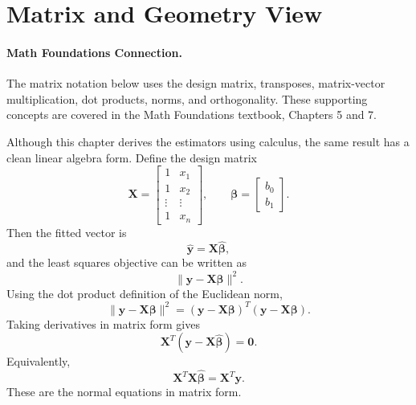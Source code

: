 \section{Matrix and Geometry View}

\paragraph{Math Foundations Connection.}
The matrix notation below uses the design matrix, transposes, matrix-vector multiplication, dot products, norms, and orthogonality.  These supporting concepts are covered in the Math Foundations textbook, Chapters 5 and 7.

Although this chapter derives the estimators using calculus, the same result has a clean linear algebra form.  Define the design matrix
\begin{equation}
  \mathbf{X}=\begin{bmatrix}
    1 & x_1 \\
    1 & x_2 \\
    \vdots & \vdots \\
    1 & x_n
  \end{bmatrix},
  \qquad
  \boldsymbol{\beta}=\begin{bmatrix}b_0\\b_1\end{bmatrix}.
\end{equation}
Then the fitted vector is
\begin{equation}
  \widehat{\mathbf{y}}=\mathbf{X}\widehat{\boldsymbol{\beta}},
\end{equation}
and the least squares objective can be written as
\begin{equation}
  \|\mathbf{y}-\mathbf{X}\boldsymbol{\beta}\|^2.
\end{equation}
Using the dot product definition of the Euclidean norm,
\begin{equation}
  \|\mathbf{y}-\mathbf{X}\boldsymbol{\beta}\|^2
  =(\mathbf{y}-\mathbf{X}\boldsymbol{\beta})^T(\mathbf{y}-\mathbf{X}\boldsymbol{\beta}).
\end{equation}
Taking derivatives in matrix form gives
\begin{equation}
  \mathbf{X}^T(\mathbf{y}-\mathbf{X}\widehat{\boldsymbol{\beta}})=\mathbf{0}.
\end{equation}
Equivalently,
\begin{equation}
  \boxed{\mathbf{X}^T\mathbf{X}\widehat{\boldsymbol{\beta}}=\mathbf{X}^T\mathbf{y}.}
  \label{eq:ch5-matrix-normal-equations}
\end{equation}
These are the normal equations in matrix form.

